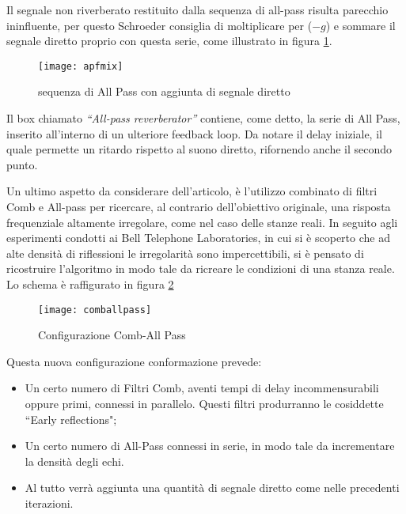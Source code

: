 Il segnale non riverberato restituito dalla sequenza di all-pass risulta parecchio ininfluente, per questo Schroeder consiglia di moltiplicare per ($-g$) e sommare il segnale diretto proprio con questa serie, come illustrato in figura \ref{fig:apfmix}.

\begin{figure}[htp]
\centering
\texttt{[image: apfmix]}
\caption{sequenza di All Pass con aggiunta di segnale diretto}
\label{fig:apfmix}
\end{figure}

Il box chiamato \emph{“All-pass reverberator”} contiene, come detto, la serie di All Pass, inserito all’interno di un ulteriore feedback loop.
Da notare il delay iniziale, il quale permette un ritardo rispetto al suono diretto, rifornendo anche il secondo punto.

\bigskip

Un ultimo aspetto da considerare dell’articolo,  è l’utilizzo combinato di filtri Comb e All-pass per ricercare, al contrario dell’obiettivo originale, una risposta frequenziale altamente irregolare, come nel caso delle stanze reali.
In seguito agli esperimenti condotti ai Bell Telephone Laboratories, in cui si è scoperto che ad alte densità di riflessioni le irregolarità sono impercettibili, si è pensato di ricostruire l’algoritmo in modo tale da ricreare le condizioni di una stanza reale.
Lo schema è raffigurato in figura \ref{fig:comballpass}
\smallskip

\begin{figure}[htp]
\centering
\texttt{[image: comballpass]}
\caption{Configurazione Comb-All Pass}
\label{fig:comballpass}
\end{figure}

Questa nuova configurazione conformazione prevede:
\begin{itemize}
\item Un certo numero di Filtri Comb, aventi tempi di delay incommensurabili oppure primi, connessi in parallelo. Questi filtri produrranno le cosiddette “Early reflections";
\item Un certo numero di All-Pass connessi in serie, in modo tale da incrementare la densità degli echi.
\item Al tutto verrà aggiunta una quantità di segnale diretto come nelle precedenti iterazioni.
\end{itemize}
